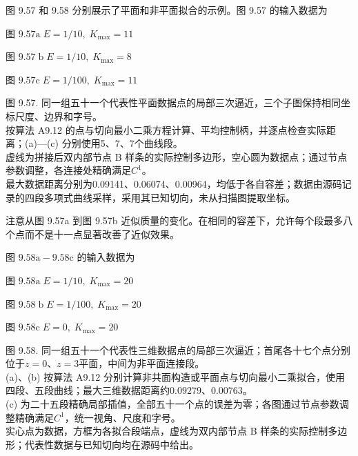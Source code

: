 \documentclass[../main.tex]{subfiles}
\begin{document}
图 9.57 和 9.58 分别展示了平面和非平面拟合的示例。图 9.57 的输入数据为

图 \({9.57}\mathrm{a}\;E = 1/{10},\;{K}_{\max } = {11}\)

图 \({9.57}\mathrm{\;b}\;E = 1/{10},\;{K}_{\max } = 8\)

图 \({9.57}\mathrm{c}\;E = 1/{100},\;{K}_{\max } = {11}\)

\begin{center}
\begin{minipage}{27cm}
\vspace*{.6\baselineskip}
\centering
{}
\par\smallskip
图 9.57. 同一组五十一个代表性平面数据点的局部三次逼近，三个子图保持相同坐标尺度、边界和字号。\\
按算法 A9.12 的点与切向最小二乘方程计算、平均控制柄，并逐点检查实际距离；(a)—(c) 分别使用5、7、7个曲线段。\\
虚线为拼接后双内部节点 B 样条的实际控制多边形，空心圆为数据点；通过节点参数调整，各连接处精确满足$C^1$。\\
最大数据距离分别为0.09141、0.06074、0.00964，均低于各自容差；数据由源码记录的四段多项式曲线采样，采用其已知切向，未从扫描图提取坐标。
\end{minipage}
\end{center}

注意从图 9.57a 到图 9.57b 近似质量的变化。在相同的容差下，允许每个段最多八个点而不是十一点显著改善了近似效果。









图 \({9.58}\mathrm{a} - {9.58}\mathrm{c}\) 的输入数据为

图 \({9.58}\mathrm{a}\;E = 1/{10},\;{K}_{\max } = {20}\)

图 \({9.58}\mathrm{\;b}\;E = 1/{100},\;{K}_{\max } = {20}\)

图 \({9.58}\mathrm{c}\;E = 0,\;{K}_{\max } = {20}\)

\begin{center}
\begin{minipage}{35cm}
\vspace*{.6\baselineskip}
\centering
{}\par\smallskip
{}
\par\smallskip
图 9.58. 同一组五十一个代表性三维数据点的局部三次逼近；首尾各十七个点分别位于$z=0$、$z=3$平面，中间为非平面连接段。\\
(a)、(b) 按算法 A9.12 分别计算非共面构造或平面点与切向最小二乘拟合，使用四段、五段曲线；最大三维数据距离约$0.09279$、$0.00763$。\\
(c) 为二十五段精确局部插值，全部五十一个点的误差为零；各图通过节点参数调整精确满足$C^1$，统一视角、尺度和字号。\\
实心点为数据，方框为各拟合段端点，虚线为双内部节点 B 样条的实际控制多边形；代表性数据与已知切向均在源码中给出。
\end{minipage}
\end{center}
\end{document}
